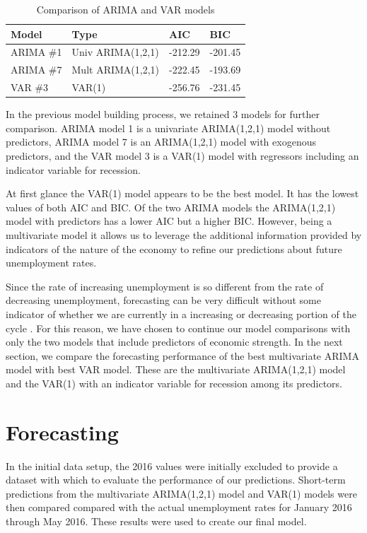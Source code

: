 \documentclass[twoside,twocolumn]{article}
\begin{document}
\begin{table}[H]
\centering
\caption{Comparison of ARIMA and VAR models}
\begin{tabular}{llll}
  \hline
Model & Type & AIC & BIC \\
  \hline
ARIMA \#1 &Univ ARIMA(1,2,1) &   -212.29 & -201.45  \\
ARIMA \#7 & Mult ARIMA(1,2,1)  & -222.45 & -193.69   \\
VAR \#3 & VAR(1) & -256.76 & -231.45 \\
   \hline
\end{tabular}
\end{table}


In the previous model building process, we retained 3 models for further comparison. ARIMA model 1 is a univariate ARIMA(1,2,1) model without predictors, ARIMA model 7 is an ARIMA(1,2,1) model with exogenous predictors, and the VAR model 3 is a VAR(1) model with regressors including an indicator variable for recession.

At first glance the VAR(1) model appears to be the best model.  It has the lowest values of both AIC and BIC.  Of the two ARIMA models the ARIMA(1,2,1) model with predictors has a lower AIC but a higher BIC. However, being a multivariate model it allows us to leverage the additional information provided by indicators of the nature of the economy to refine our predictions about future unemployment rates.

Since the rate of increasing unemployment is so different from the rate of decreasing unemployment, forecasting can be very difficult without some indicator of whether we are currently in a increasing or decreasing portion of the cycle \citep{Montgomery1998}. For this reason, we have chosen to continue our model comparisons with only the two models that include predictors of economic strength. In the next section, we compare the forecasting performance of the best multivariate ARIMA model with best VAR model. These are the multivariate ARIMA(1,2,1) model and the VAR(1) with an indicator variable for recession among its predictors.


\section{Forecasting}

In the initial data setup, the 2016 values were initially excluded to provide a dataset with which to evaluate the performance of our predictions. Short-term predictions from the multivariate ARIMA(1,2,1) model and VAR(1) models were then compared compared with the actual unemployment rates for January 2016 through May 2016. These results were used to create our final model.
\end{document}
